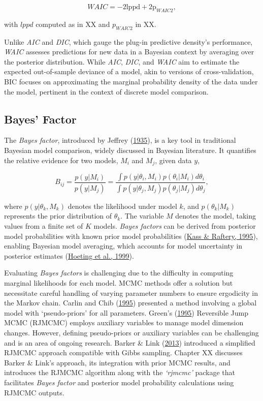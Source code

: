 \documentclass[
  11pt,
]{article}
\begin{document}
\begin{equation}
WAIC = -2\text{lppd} + 2\text{p}_{WAIC2},
\end{equation}

with \(lppd\) computed as in XX and \(p_{WAIC2}\) in XX.

Unlike \emph{AIC} and \emph{DIC}, which gauge the plug-in predictive
density's performance, \emph{WAIC} assesses predictions for new data in
a Bayesian context by averaging over the posterior distribution. While
\emph{AIC}, \emph{DIC}, and \emph{WAIC} aim to estimate the expected
out-of-sample deviance of a model, akin to versions of cross-validation,
BIC focuses on approximating the marginal probability density of the
data under the model, pertinent in the context of discrete model
comparison.

\subsection{Bayes’ Factor}

The \emph{Bayes factor}, introduced by Jeffrey
(\protect\hyperlink{ref-jeffreys1935}{1935}), is a key tool in
traditional Bayesian model comparison, widely discussed in Bayesian
literature. It quantifies the relative evidence for two models, \(M_i\)
and \(M_j\), given data \(y\),

\begin{equation}
B_{ij} = \frac{p(y|M_i)}{p(y|M_j)} = \frac{\int p(y|\theta_i,M_i)p(\theta_i|M_i)d\theta_i}{\int p(y|\theta_j,M_j)p(\theta_j|M_j)d\theta_j},
\end{equation}

where \(p(y|\theta_k,M_k)\) denotes the likelihood under model \(k\),
and \(p(\theta_k|M_k)\) represents the prior distribution of
\(\theta_k\). The variable \(M\) denotes the model, taking values from a
finite set of \(K\) models. \emph{Bayes factors} can be derived from
posterior model probabilities with known prior model probabilities
(\protect\hyperlink{ref-Kass1995}{Kass \& Raftery, 1995}), enabling
Bayesian model averaging, which accounts for model uncertainty in
posterior estimates (\protect\hyperlink{ref-Hoeting1999}{Hoeting et al.,
1999}).

Evaluating \emph{Bayes factors} is challenging due to the difficulty in
computing marginal likelihoods for each model. MCMC methods offer a
solution but necessitate careful handling of varying parameter numbers
to ensure ergodicity in the Markov chain. Carlin and Chib
(\protect\hyperlink{ref-Carlin1995}{1995}) presented a method involving
a global model with `pseudo-priors' for all parameters. Green's
(\protect\hyperlink{ref-Green1995}{1995}) Reversible Jump MCMC (RJMCMC)
employs auxiliary variables to manage model dimension changes. However,
defining pseudo-priors or auxiliary variables can be challenging and is
an area of ongoing research. Barker \& Link
(\protect\hyperlink{ref-Barker2013}{2013}) introduced a simplified
RJMCMC approach compatible with Gibbs sampling. Chapter XX discusses
Barker \& Link's approach, its integration with prior MCMC results, and
introduces the RJMCMC algorithm along with the \emph{`rjmcmc'} package
that facilitates \emph{Bayes factor} and posterior model probability
calculations using RJMCMC outputs.
\end{document}
